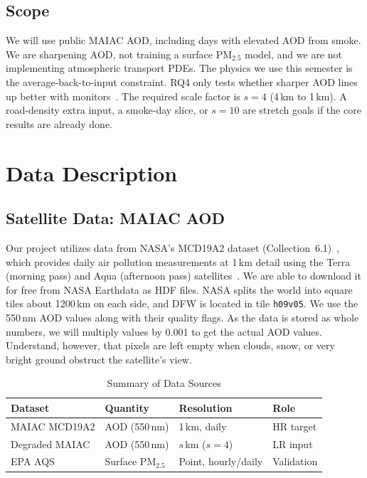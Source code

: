\documentclass[conference]{IEEEtran}
\begin{document}
\subsection{Scope}
We will use public MAIAC AOD, including days with elevated AOD from smoke. We are sharpening AOD, not training a surface PM$_{2.5}$ model, and we are not implementing atmospheric transport PDEs. The physics we use this semester is the average-back-to-input constraint. RQ4 only tests whether sharper AOD lines up better with monitors~\cite{di2019ensemble}. The required scale factor is $s{=}4$ (4\,km to 1\,km). A road-density extra input, a smoke-day slice, or $s{=}10$ are stretch goals if the core results are already done.
\section{Data Description}
\subsection{Satellite Data: MAIAC AOD}
Our project utilizes data from NASA's MCD19A2 dataset (Collection~6.1)~\cite{mcd19a2}, which provides daily air pollution measurements at 1\,km detail using the Terra (morning pass) and Aqua (afternoon pass) satellites~\cite{lyapustin2018maiac}. We are able to download it for free from NASA Earthdata as HDF files. NASA splits the world into square tiles about 1200\,km on each side, and DFW is located in tile \texttt{h09v05}. We use the 550\,nm AOD values along with their quality flags. As the data is stored as whole numbers, we will multiply values by 0.001 to get the actual AOD values. Understand, however, that pixels are left empty when clouds, snow, or very bright ground obstruct the satellite's view.
\begin{table}[H]
\caption{Summary of Data Sources}
\label{tab:data}
\centering
\footnotesize
\setlength{\tabcolsep}{3pt}
\renewcommand{\arraystretch}{1.0}
\begin{tabularx}{\columnwidth}{@{}l l l >{\raggedright\arraybackslash}X@{}}
\toprule
\textbf{Dataset} & \textbf{Quantity} & \textbf{Resolution} & \textbf{Role} \\
\midrule
MAIAC MCD19A2 & AOD (550\,nm) & 1\,km, daily & HR target \\
Degraded MAIAC & AOD (550\,nm) & $s$\,km ($s{=}4$) & LR input \\
EPA AQS & Surface PM$_{2.5}$ & Point, hourly/daily & Validation \\
\bottomrule
\end{tabularx}
\end{table}
\end{document}
